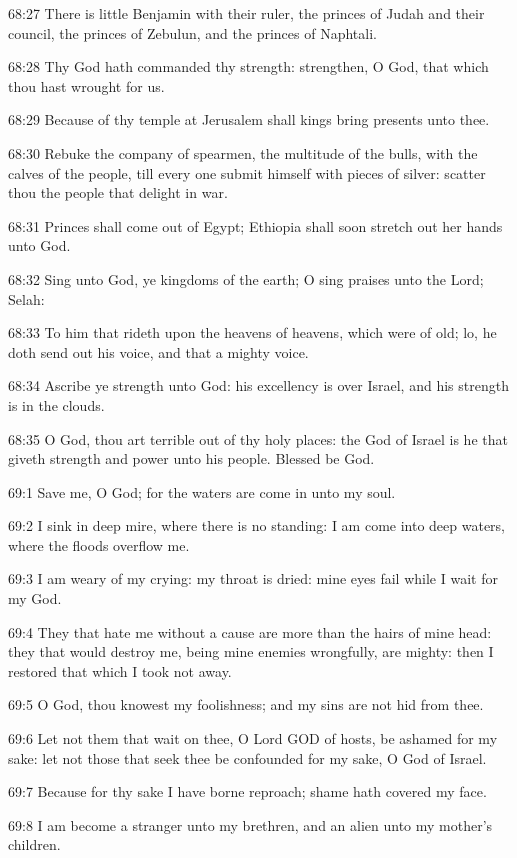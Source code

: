 68:27 There is little Benjamin with their ruler, the princes of Judah
and their council, the princes of Zebulun, and the princes of
Naphtali.

68:28 Thy God hath commanded thy strength: strengthen, O God, that
which thou hast wrought for us.

68:29 Because of thy temple at Jerusalem shall kings bring presents
unto thee.

68:30 Rebuke the company of spearmen, the multitude of the bulls, with
the calves of the people, till every one submit himself with pieces of
silver: scatter thou the people that delight in war.

68:31 Princes shall come out of Egypt; Ethiopia shall soon stretch out
her hands unto God.

68:32 Sing unto God, ye kingdoms of the earth; O sing praises unto the
Lord; Selah:

68:33 To him that rideth upon the heavens of heavens, which were of
old; lo, he doth send out his voice, and that a mighty voice.

68:34 Ascribe ye strength unto God: his excellency is over Israel, and
his strength is in the clouds.

68:35 O God, thou art terrible out of thy holy places: the God of
Israel is he that giveth strength and power unto his people. Blessed
be God.



69:1 Save me, O God; for the waters are come in unto my soul.

69:2 I sink in deep mire, where there is no standing: I am come into
deep waters, where the floods overflow me.

69:3 I am weary of my crying: my throat is dried: mine eyes fail while
I wait for my God.

69:4 They that hate me without a cause are more than the hairs of mine
head: they that would destroy me, being mine enemies wrongfully, are
mighty: then I restored that which I took not away.

69:5 O God, thou knowest my foolishness; and my sins are not hid from
thee.

69:6 Let not them that wait on thee, O Lord GOD of hosts, be ashamed
for my sake: let not those that seek thee be confounded for my sake, O
God of Israel.

69:7 Because for thy sake I have borne reproach; shame hath covered my
face.

69:8 I am become a stranger unto my brethren, and an alien unto my
mother's children.


